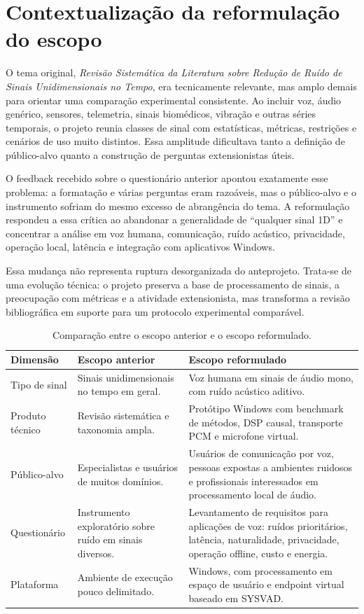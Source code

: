 \section{Contextualização da reformulação do escopo}

O tema original, \textit{Revisão Sistemática da Literatura sobre Redução de Ruído de Sinais Unidimensionais no Tempo}, era tecnicamente relevante, mas amplo demais para orientar uma comparação experimental consistente. Ao incluir voz, áudio genérico, sensores, telemetria, sinais biomédicos, vibração e outras séries temporais, o projeto reunia classes de sinal com estatísticas, métricas, restrições e cenários de uso muito distintos. Essa amplitude dificultava tanto a definição de público-alvo quanto a construção de perguntas extensionistas úteis.

O feedback recebido sobre o questionário anterior apontou exatamente esse problema: a formatação e várias perguntas eram razoáveis, mas o público-alvo e o instrumento sofriam do mesmo excesso de abrangência do tema. A reformulação respondeu a essa crítica ao abandonar a generalidade de ``qualquer sinal 1D'' e concentrar a análise em voz humana, comunicação, ruído acústico, privacidade, operação local, latência e integração com aplicativos Windows.

Essa mudança não representa ruptura desorganizada do anteprojeto. Trata-se de uma evolução técnica: o projeto preserva a base de processamento de sinais, a preocupação com métricas e a atividade extensionista, mas transforma a revisão bibliográfica em suporte para um protocolo experimental comparável.

\begin{table}[!htbp]
\centering
\caption{Comparação entre o escopo anterior e o escopo reformulado.}
\label{tab:escopo}
\begin{tabularx}{\textwidth}{>{\raggedright\arraybackslash}p{3.4cm}XX}
\toprule
\textbf{Dimensão} & \textbf{Escopo anterior} & \textbf{Escopo reformulado} \\
\midrule
Tipo de sinal & Sinais unidimensionais no tempo em geral. & Voz humana em sinais de áudio mono, com ruído acústico aditivo. \\
\addlinespace
Produto técnico & Revisão sistemática e taxonomia ampla. & Protótipo Windows com benchmark de métodos, DSP causal, transporte PCM e microfone virtual. \\
\addlinespace
Público-alvo & Especialistas e usuários de muitos domínios. & Usuários de comunicação por voz, pessoas expostas a ambientes ruidosos e profissionais interessados em processamento local de áudio. \\
\addlinespace
Questionário & Instrumento exploratório sobre ruído em sinais diversos. & Levantamento de requisitos para aplicações de voz: ruídos prioritários, latência, naturalidade, privacidade, operação offline, custo e energia. \\
\addlinespace
Plataforma & Ambiente de execução pouco delimitado. & Windows, com processamento em espaço de usuário e endpoint virtual baseado em SYSVAD. \\
\bottomrule
\end{tabularx}
\end{table}
\FloatBarrier

